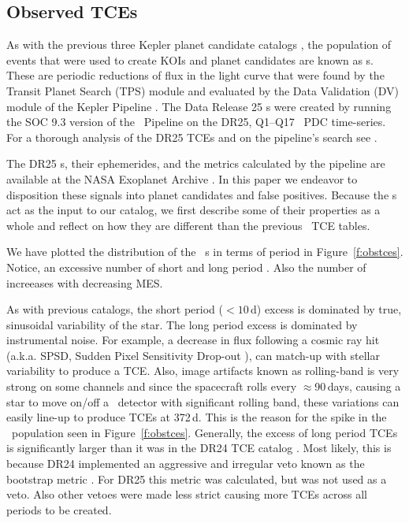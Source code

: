\subsection{Observed TCEs}

\label{s:tces}
As with the previous three Kepler planet candidate catalogs \citep{Coughlin2016,Mullally2015cat,Rowe2015cat}, the population of events that were used to create KOIs and planet candidates are known as \opstce s. These are periodic reductions of flux in the light curve that were found by the Transit Planet Search (TPS) module and evaluated by the Data Validation (DV) module of the Kepler Pipeline \citep{JenkinsKDPH}.   The Data Release 25 \opstce s were created by running the SOC 9.3 version of the \Kepler\ Pipeline on the DR25, Q1--Q17 \Kepler\ PDC time-series.  For a thorough analysis of the DR25 TCEs and on the pipeline's search see \citet{Twicken2016}. 

The DR25 \opstce s, their ephemerides, and the metrics calculated by the pipeline are available at the NASA Exoplanet Archive \citep{Akeson2013}.  In this paper we endeavor to disposition these signals into planet candidates and false positives.  Because the \opstce s act as the input to our catalog, we first describe some of their properties as a whole and reflect on how they are different than the previous \Kepler\ TCE tables.

We have plotted the distribution of the \ntcesnorogue\ \opstce s in terms of period in Figure~\ref{f:obstces}. Notice, an excessive number of short and long period . Also the number of  increeases with decreasing MES. 

As with previous catalogs, the short period ($<10$\,d) excess is dominated by true, sinusoidal variability of the star. The long period excess is dominated by instrumental noise. For example, a decrease in flux following a cosmic ray hit (a.k.a. SPSD, Sudden Pixel Sensitivity Drop-out \citep{KDCH}), can match-up with stellar variability to produce a TCE. Also, image artifacts known as rolling-band is very strong on some channels \citep[see \S6.7 of][]{KIH}  and since the spacecraft rolls every $\approx$90\,days, causing a star to move on/off a \Kepler\ detector with significant rolling band, these variations can easily line-up to produce TCEs at 372\,d. This is the reason for the spike in the \opstce\ population seen in Figure~\ref{f:obstces}. Generally, the excess of long period TCEs is significantly larger than it was in the DR24 TCE catalog \citep{Seader2015}. Most likely, this is because DR24 implemented an aggressive and irregular veto known as the bootstrap metric \citep{JenkinsBootstrap}.  For DR25 this metric was calculated, but was not used as a veto. Also other vetoes were made less strict causing more TCEs across all periods to be created. 

